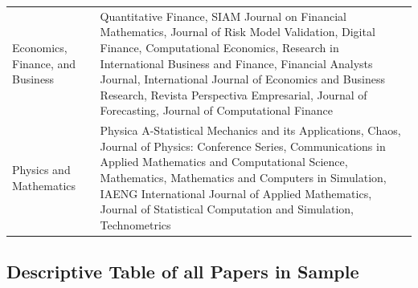 \begin{table}[H]
\begin{adjustbox}{width=1\textwidth,center}
\begin{tabular}{p{} p{}}
        \addlinespace
        \hdashline[0.2pt/3pt]
        \addlinespace
        Economics, Finance, and Business & Quantitative Finance, SIAM Journal on Financial Mathematics, Journal of Risk Model Validation, Digital Finance, Computational Economics, Research in International Business and Finance, Financial Analysts Journal, International Journal of Economics and Business Research, Revista Perspectiva Empresarial, Journal of Forecasting, Journal of Computational Finance \\
        \addlinespace
        \hdashline[0.2pt/3pt]
        \addlinespace
        Physics and Mathematics & Physica A-Statistical Mechanics and its Applications, Chaos, Journal of Physics: Conference Series, Communications in Applied Mathematics and Computational Science, Mathematics, Mathematics and Computers in Simulation, IAENG International Journal of Applied Mathematics, Journal of Statistical Computation and Simulation, Technometrics \\
        \bottomrule
    \end{tabular}
    \end{adjustbox}
\end{table}




\subsection{Descriptive Table of all Papers in Sample}
\label{appendix:descriptive_table_of_all_articles}
\renewcommand{\thetable}{E\arabic{table}} %
\setcounter{table}{0} %
\scriptsize %
\setlength\LTcapwidth{\textheight} %

